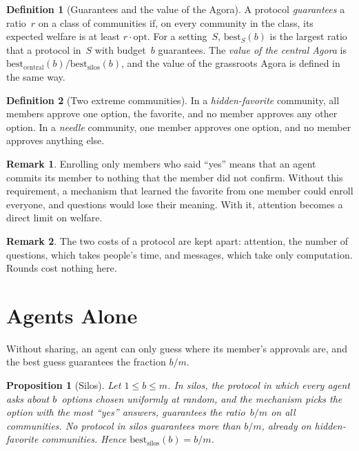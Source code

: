 \documentclass[11pt]{article}
\newtheorem{proposition}{Proposition}
\theoremstyle{definition}
\newtheorem{definition}{Definition}
\newtheorem{remark}{Remark}
\newcommand{\opt}{\mathrm{opt}}
\newcommand{\best}{\mathrm{best}}
\begin{document}
\begin{definition}[Guarantees and the value of the Agora]
A protocol \emph{guarantees} a ratio~$r$ on a class of communities if, on every community in the class, its expected welfare is at least $r \cdot \opt$.
For a setting~$S$, $\best_S(b)$ is the largest ratio that a protocol in~$S$ with budget~$b$ guarantees.
The \emph{value of the central Agora} is $\best_{\text{central}}(b) / \best_{\text{silos}}(b)$, and the value of the grassroots Agora is defined in the same way.
\end{definition}

\begin{definition}[Two extreme communities]
In a \emph{hidden-favorite} community, all members approve one option, the favorite, and no member approves any other option.
In a \emph{needle} community, one member approves one option, and no member approves anything else.
\end{definition}

\begin{remark}
Enrolling only members who said ``yes'' means that an agent commits its member to nothing that the member did not confirm.
Without this requirement, a mechanism that learned the favorite from one member could enroll everyone, and questions would lose their meaning.
With it, attention becomes a direct limit on welfare.
\end{remark}

\begin{remark}
The two costs of a protocol are kept apart: attention, the number of questions, which takes people's time, and messages, which take only computation.
Rounds cost nothing here.
\end{remark}

\section{Agents Alone}

Without sharing, an agent can only guess where its member's approvals are, and the best guess guarantees the fraction $b/m$.

\begin{proposition}[Silos]\label{prop:silos}
Let $1 \le b \le m$.
In silos, the protocol in which every agent asks about $b$~options chosen uniformly at random, and the mechanism picks the option with the most ``yes'' answers, guarantees the ratio~$b/m$ on all communities.
No protocol in silos guarantees more than $b/m$, already on hidden-favorite communities.
Hence $\best_{\text{silos}}(b) = b/m$.
\end{proposition}
\end{document}
